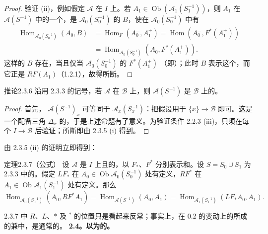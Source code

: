 \begin{proof}
验证 (ii)，例如假定 $\mathcal A$ 在 $I$ 上。若 $A_1\in\operatorname{Ob}(\mathcal A_1(S_1^{-1}))$，则 $A_1$ 在 $\mathcal A(S^{-1})$ 中的一个，是 $\mathcal A_0(S_0^{-1})$ 的 $B$，使在 $\mathcal A_0(S_0^{-1})$ 中有
\[
\begin{aligned}
\operatorname{Hom}_{\mathcal A_0(S_0^{-1})}(A_0,B)
&=\operatorname{Hom}_F(A_0^-,A_1^+)=\operatorname{Hom}(A_0^-,F^*(A_1^+))\\
&=\operatorname{Hom}_{\mathcal A_0(S_0^{-1})}(A_0,F^*(A_1^+)).
\end{aligned}
\]
这样的 $B$ 存在，当且仅当 $\mathcal A_0(S_0^{-1})$ 的 $F^*(A_1^+)$ （即）；此时 $B$ 表示这个，而它正是 $RF(A_1)$（1.2.1），故得所断。
\end{proof}

\begin{SGAresult}{推论}{2.3.6}
沿用 2.3.3 的记号，若 $\mathcal A$ 在 $\mathcal B$ 上，则 $\mathcal A(S^{-1})$ 是 $\mathcal B$ 上的。
\end{SGAresult}
\begin{proof}
首先， $\mathcal A(S^{-1})_x$ 可等同于 $\mathcal A_x(S_x^{-1})$：把假设用于 $\{x\}\to\mathcal B$ 即可。这是一个配备三角 $\Delta_x$ 的，于是上述命题有了意义。为验证条件 2.2.3 (iii)，只须在每个 $I\to\mathcal B$ 后验证；所断即由 2.3.5 (i) 得到。
\end{proof}
由 2.3.5 (ii) 的证明立即得到：

\begin{SGAresult}{定理}{2.3.7（公式）}
设 $\mathcal A$ 是 $I$ 上且的，以 $F_*$、$F^*$ 分别表示和。设 $S=S_0\cup S_1$ 为 2.3.3 中的。假定 $LF_*$ 在 $A_0\in\operatorname{Ob}\mathcal A_0(S_0^{-1})$ 处有定义，$RF^*$ 在 $A_1\in\operatorname{Ob}\mathcal A_1(S_1^{-1})$ 处有定义。那么
\[
\operatorname{Hom}_{\mathcal A_0(S_0^{-1})}(A_0,RF^*A_1)
=\operatorname{Hom}_{\mathcal A(S^{-1})}(A_0,A_1)
=\operatorname{Hom}_{\mathcal A_1(S_1^{-1})}(LF_*A_0,A_1).
\]
\end{SGAresult}
2.3.7 中 $R$、$L$、$*$ 及 ${}^*$ 的位置只是看起来反常；事实上，在 0.2 的变动上的所成的兼中，是通常的。
\textbf{2.4。以为的。}

